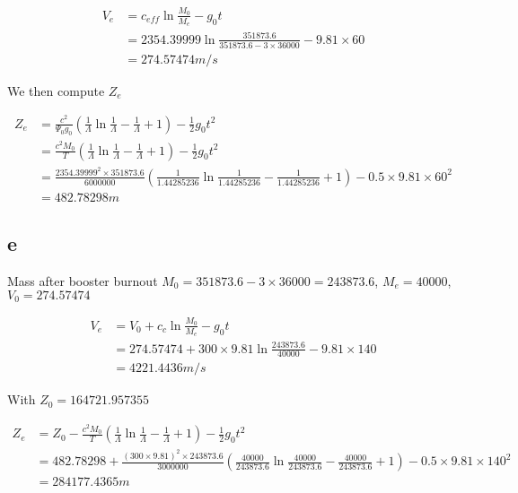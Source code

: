 \begin{equation}
    \begin{split}
        V_e &= c_{eff} \ln{\frac{M_0}{M_e}} - g_0 t \\
        &= 2354.39999 \ln{\frac{351873.6}{351873.6 - 3 \times 36000}} - 9.81 \times 60 \\
        &= 274.57474 m/s
    \end{split}
\end{equation}

We then compute $Z_e$

\begin{equation}
    \begin{split}
        Z_e  &= \frac{c^2}{\Psi_0 g_0} (\frac{1}{\Lambda} \ln{\frac{1}{\Lambda}} - \frac{1}{\Lambda} + 1)- \frac{1}{2}g_0 t^2 \\
        &= \frac{c^2 M_0}{T} (\frac{1}{\Lambda} \ln{\frac{1}{\Lambda}} - \frac{1}{\Lambda} + 1)- \frac{1}{2}g_0 t^2 \\
        &= \frac{2354.39999^2 \times 351873.6}{6000000}(\frac{1}{1.44285236} \ln{\frac{1}{1.44285236}} - \frac{1}{1.44285236} + 1) - 0.5 \times 9.81 \times 60^2 \\
        &= 482.78298 m
    \end{split}
\end{equation}

\subsection*{e}

Mass after booster burnout $M_0 = 351873.6 - 3 \times 36000 = 243873.6$, $M_e = 40000$, $V_0 = 274.57474$

\begin{equation}
    \begin{split}
        V_e &= V_0 + c_{c} \ln{\frac{M_0}{M_e}} - g_0 t \\
        &= 274.57474 + 300 \times 9.81 \ln{\frac{243873.6}{40000}} - 9.81 \times 140 \\
        &=  4221.4436 m/s
    \end{split}
\end{equation}

With $Z_0 = 164721.957355$

\begin{equation}
    \begin{split}
        Z_e  
        &= Z_0 -\frac{c^2 M_0}{T} (\frac{1}{\Lambda} \ln{\frac{1}{\Lambda}} - \frac{1}{\Lambda} + 1)- \frac{1}{2}g_0 t^2 \\
        &= 482.78298 +  \frac{(300\times 9.81)^2 \times 243873.6}{3000000}(\frac{40000}{243873.6} \ln{\frac{40000}{243873.6}} - \frac{40000}{243873.6} + 1) - 0.5 \times 9.81 \times 140^2 \\
        &= 284177.4365 m
    \end{split}
\end{equation}


